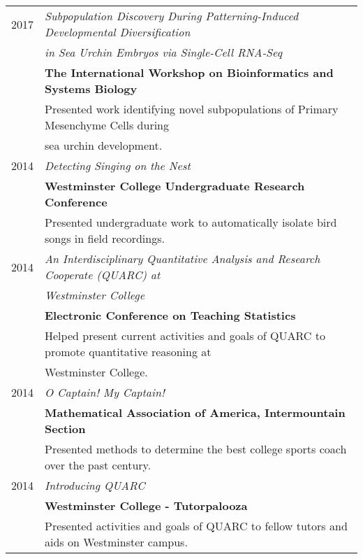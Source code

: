 \documentclass[a4paper,10pt]{article}
\begin{document}
\begin{longtable}{rl}
	\textsc{2017} & \emph{Subpopulation Discovery During Patterning-Induced
	Developmental Diversification}                                                                       \\
	              & \emph{in Sea Urchin Embryos via Single-Cell RNA-Seq}                                 \\
	              & \textbf{The International Workshop on Bioinformatics and Systems Biology}            \\
	              & \small{Presented work identifying novel subpopulations of Primary
	Mesenchyme Cells during}                                                                             \\
	              & \small{sea urchin development.}                                                      \\

	\textsc{2014} & \emph{Detecting Singing on the Nest}
	\\& \textbf{Westminster College Undergraduate Research Conference}
	\\& \small{Presented undergraduate work to automatically isolate bird songs in
	field recordings.}                                                                                   \\

	\textsc{2014} & \emph{An Interdisciplinary Quantitative Analysis and Research Cooperate (QUARC) at}  \\
	              & \emph{Westminster College}
	\\ & \textbf{Electronic Conference on Teaching Statistics}
	\\ & \small{Helped present current activities and goals of QUARC to promote quantitative reasoning at}
	\\ &\small{ Westminster College.} \\

	\textsc{2014} & \emph{O Captain! My Captain!}
	\\& \textbf{Mathematical Association of America, Intermountain Section}
	\\& \small{Presented methods to determine the best college sports coach over
	the past century.}                                                                                   \\

	\textsc{2014} & \emph{Introducing QUARC}
	\\& \textbf{Westminster College - Tutorpalooza}
	\\& \small{Presented activities and goals of QUARC to fellow tutors and aids on
	Westminster campus.}                                                                                 \\


\end{longtable}
\end{document}
